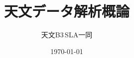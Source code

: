 \renewcommand{\maketitle}{%
  \begin{titlepage}%
    \let\footnotesize\small
    \let\footnoterule\relax
    \let\footnote\thanks
    \null\vfil
    \vskip 20\p@
    \begin{center}%
      {\Large もし天{\@seireki}年度版 \par}%
      \vskip 12em%
      {\LARGE \@title \par}%
      \vskip 15em%
      {\large
        \begin{tabular}[t]{c}%
          \@SyozokuUniv 天文学教室
        \end{tabular}\par}%
      \vskip 5em%
      {\large
        \begin{tabular}[t]{c}%
            {\Large \@author}
        \end{tabular}\par}%
      \vskip 1.5em
      {\large \@date \par}%
    \end{center}%
    \par
    \@thanks\vfil\null
  \end{titlepage}%
  \setcounter{footnote}{0}%
  \global\let\thanks\relax
  \global\let\maketitle\relax
  \global\let\@thanks\@empty
  \global\let\@author\@empty
  \global\let\@date\@empty
  \global\let\@title\@empty
  \global\let\title\relax
  \global\let\author\relax
  \global\let\date\relax
  \global\let\and\relax
}%

\makeatother

\title{天文データ解析概論}
\date{\today} %
\author{天文B3\,SLA一同} %

